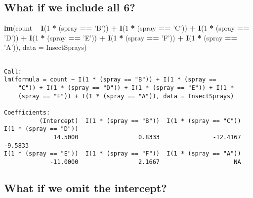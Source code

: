 \documentclass[12pt,]{04-class-files/abntex2}
\newenvironment{Shaded}{\begin{snugshade}}{\end{snugshade}}
\newcommand{\DataTypeTok}[1]{\textcolor[rgb]{0.13,0.29,0.53}{#1}}
\newcommand{\DecValTok}[1]{\textcolor[rgb]{0.00,0.00,0.81}{#1}}
\newcommand{\KeywordTok}[1]{\textcolor[rgb]{0.13,0.29,0.53}{\textbf{#1}}}
\newcommand{\NormalTok}[1]{#1}
\newcommand{\OperatorTok}[1]{\textcolor[rgb]{0.81,0.36,0.00}{\textbf{#1}}}
\newcommand{\StringTok}[1]{\textcolor[rgb]{0.31,0.60,0.02}{#1}}
\begin{document}
\hypertarget{what-if-we-include-all-6}{%
\subsection{What if we include all 6?}\label{what-if-we-include-all-6}}

\begin{Shaded}
\begin{Highlighting}[]
\KeywordTok{lm}\NormalTok{(count }\OperatorTok{~}\StringTok{ }
\StringTok{   }\KeywordTok{I}\NormalTok{(}\DecValTok{1} \OperatorTok{*}\StringTok{ }\NormalTok{(spray }\OperatorTok{==}\StringTok{ 'B'}\NormalTok{)) }\OperatorTok{+}\StringTok{ }\KeywordTok{I}\NormalTok{(}\DecValTok{1} \OperatorTok{*}\StringTok{ }\NormalTok{(spray }\OperatorTok{==}\StringTok{ 'C'}\NormalTok{)) }\OperatorTok{+}\StringTok{  }
\StringTok{   }\KeywordTok{I}\NormalTok{(}\DecValTok{1} \OperatorTok{*}\StringTok{ }\NormalTok{(spray }\OperatorTok{==}\StringTok{ 'D'}\NormalTok{)) }\OperatorTok{+}\StringTok{ }\KeywordTok{I}\NormalTok{(}\DecValTok{1} \OperatorTok{*}\StringTok{ }\NormalTok{(spray }\OperatorTok{==}\StringTok{ 'E'}\NormalTok{)) }\OperatorTok{+}
\StringTok{   }\KeywordTok{I}\NormalTok{(}\DecValTok{1} \OperatorTok{*}\StringTok{ }\NormalTok{(spray }\OperatorTok{==}\StringTok{ 'F'}\NormalTok{)) }\OperatorTok{+}\StringTok{ }\KeywordTok{I}\NormalTok{(}\DecValTok{1} \OperatorTok{*}\StringTok{ }\NormalTok{(spray }\OperatorTok{==}\StringTok{ 'A'}\NormalTok{)), }\DataTypeTok{data =}\NormalTok{ InsectSprays)}
\end{Highlighting}
\end{Shaded}

\begin{verbatim}

Call:
lm(formula = count ~ I(1 * (spray == "B")) + I(1 * (spray == 
    "C")) + I(1 * (spray == "D")) + I(1 * (spray == "E")) + I(1 * 
    (spray == "F")) + I(1 * (spray == "A")), data = InsectSprays)

Coefficients:
          (Intercept)  I(1 * (spray == "B"))  I(1 * (spray == "C"))  I(1 * (spray == "D"))  
              14.5000                 0.8333               -12.4167                -9.5833  
I(1 * (spray == "E"))  I(1 * (spray == "F"))  I(1 * (spray == "A"))  
             -11.0000                 2.1667                     NA  
\end{verbatim}

\hypertarget{what-if-we-omit-the-intercept}{%
\subsection{What if we omit the intercept?}\label{what-if-we-omit-the-intercept}}
\end{document}
